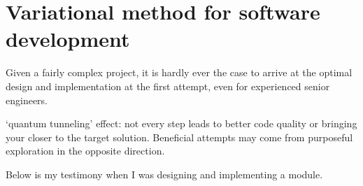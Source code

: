 
\chapter{Variational method for software development} \label{ch:variational}
Given a fairly complex project, it is hardly ever the case to arrive at the optimal design and
implementation at the first attempt, even for experienced senior engineers.

`quantum tunneling' effect: not every step leads to better code quality or bringing your closer
to the target solution.
Beneficial attempts may come from purposeful exploration in the opposite direction.

Below is my testimony when I was designing and implementing a  module.
